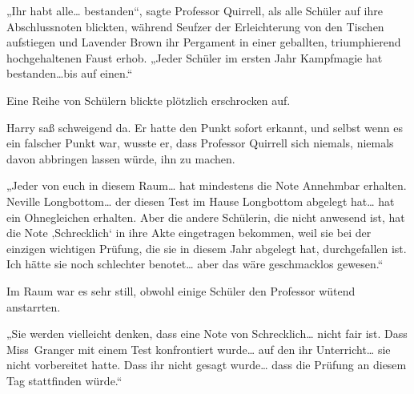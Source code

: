 „Ihr habt alle… bestanden“, sagte Professor Quirrell, als alle Schüler auf ihre Abschlussnoten blickten, während Seufzer der Erleichterung von den Tischen aufstiegen und Lavender Brown ihr Pergament in einer geballten, triumphierend hochgehaltenen Faust erhob.
„Jeder Schüler im ersten Jahr Kampfmagie hat bestanden…bis auf einen.“

Eine Reihe von Schülern blickte plötzlich erschrocken auf.

Harry saß schweigend da. Er hatte den Punkt sofort erkannt, und selbst wenn es ein falscher Punkt war, wusste er, dass Professor Quirrell sich niemals, niemals davon abbringen lassen würde, ihn zu machen.

„Jeder von euch in diesem Raum… hat mindestens die Note Annehmbar erhalten. Neville Longbottom… der diesen Test im Hause Longbottom abgelegt hat… hat ein Ohnegleichen erhalten. Aber die andere Schülerin, die nicht anwesend ist, hat die Note ‚Schrecklich‘ in ihre Akte eingetragen bekommen, weil sie bei der einzigen wichtigen Prüfung, die sie in diesem Jahr abgelegt hat, durchgefallen ist. Ich hätte sie noch schlechter benotet… aber das wäre geschmacklos gewesen.“

Im Raum war es sehr still, obwohl einige Schüler den Professor wütend anstarrten.

„Sie werden vielleicht denken, dass eine Note von Schrecklich… nicht fair ist. Dass Miss~Granger mit einem Test konfrontiert wurde… auf den ihr Unterricht… sie nicht vorbereitet hatte. Dass ihr nicht gesagt wurde… dass die Prüfung an diesem Tag stattfinden würde.“

